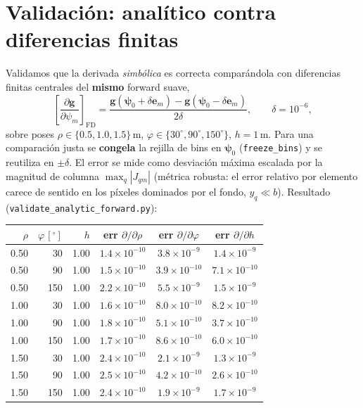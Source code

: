 \documentclass[11pt,a4paper]{article}
\theoremstyle{plain}
\theoremstyle{definition}
\newcommand{\vect}[1]{\boldsymbol{#1}}
\begin{document}
\section{Validaci\'on: anal\'itico contra diferencias finitas}
\label{sec:validacion}

Validamos que la derivada \emph{simb\'olica} es correcta compar\'andola con
diferencias finitas centrales del \textbf{mismo} forward suave,
\begin{equation}
    \left[\frac{\partial\vect{g}}{\partial\psi_m}\right]_{\mathrm{FD}}
    =\frac{\vect{g}(\vect{\psi}_0+\delta\vect{e}_m)-\vect{g}(\vect{\psi}_0-\delta\vect{e}_m)}{2\delta},
    \qquad \delta=10^{-6},
    \label{eq:fd}
\end{equation}
sobre poses $\rho\in\{0.5,1.0,1.5\}$\,m,
$\varphi\in\{30^\circ,90^\circ,150^\circ\}$, $h=1$\,m. Para una comparaci\'on
justa se \textbf{congela} la rejilla de bins en $\vect{\psi}_0$
(\texttt{freeze\_bins}) y se reutiliza en $\pm\delta$. El error se mide como
desviaci\'on m\'axima escalada por la magnitud de columna $\max_q|J_{qm}|$
(m\'etrica robusta: el error relativo por elemento carece de sentido en los
p\'ixeles dominados por el fondo, $y_q\ll b$). Resultado
(\texttt{validate\_analytic\_forward.py}):
\begin{center}
\small
\begin{tabular}{@{}rrr|ccc@{}}
\toprule
$\rho$ & $\varphi\,[^\circ]$ & $h$ & err $\partial/\partial\rho$ & err $\partial/\partial\varphi$ & err $\partial/\partial h$ \\
\midrule
0.50 &  30 & 1.00 & $1.4\times10^{-10}$ & $3.8\times10^{-9}$  & $1.4\times10^{-9}$ \\
0.50 &  90 & 1.00 & $1.5\times10^{-10}$ & $3.9\times10^{-10}$ & $7.1\times10^{-10}$ \\
0.50 & 150 & 1.00 & $2.2\times10^{-10}$ & $5.5\times10^{-9}$  & $1.5\times10^{-9}$ \\
1.00 &  30 & 1.00 & $1.6\times10^{-10}$ & $8.0\times10^{-10}$ & $8.2\times10^{-10}$ \\
1.00 &  90 & 1.00 & $1.8\times10^{-10}$ & $5.1\times10^{-10}$ & $3.7\times10^{-10}$ \\
1.00 & 150 & 1.00 & $1.7\times10^{-10}$ & $8.6\times10^{-10}$ & $6.0\times10^{-10}$ \\
1.50 &  30 & 1.00 & $2.4\times10^{-10}$ & $2.1\times10^{-9}$  & $1.3\times10^{-9}$ \\
1.50 &  90 & 1.00 & $2.5\times10^{-10}$ & $4.2\times10^{-10}$ & $2.6\times10^{-10}$ \\
1.50 & 150 & 1.00 & $2.4\times10^{-10}$ & $1.9\times10^{-9}$  & $1.7\times10^{-9}$ \\
\bottomrule
\end{tabular}
\end{center}
\end{document}
